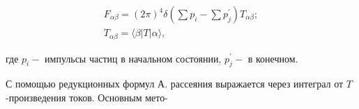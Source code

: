 \documentclass[10pt]{article}
\begin{document}
\[

\begin{gathered}

F_{\alpha \beta}=(2 \pi)^{4} \delta\left(\sum p_{i}-\sum p_{j}^{\prime}\right) T_{\alpha \beta} ; \\

T_{\alpha \beta}=\langle\beta|T| \alpha\rangle,

\end{gathered}

\]



где $p_{i}-$ импульсы частиц в начальном состоянии, $p_{j}^{\prime}-$ в конечном.



С помощью редукционных формул А. рассеяния выражается через интеграл от $T$-произведения токов. Основным мето-
\end{document}
